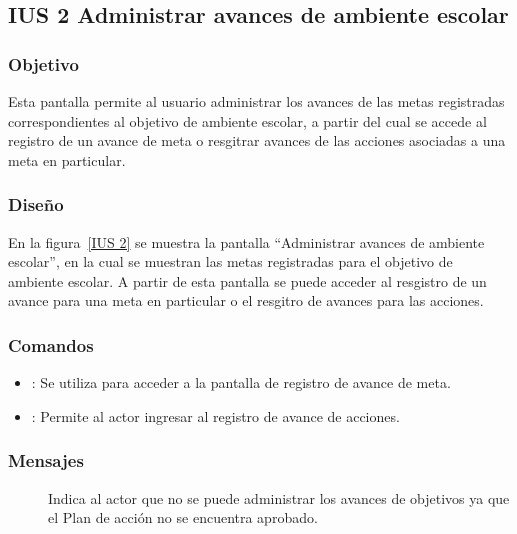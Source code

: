\subsection{IUS 2 Administrar avances de ambiente escolar}

\subsubsection{Objetivo}
	
Esta pantalla permite al usuario  administrar los avances de las metas registradas correspondientes al objetivo de ambiente escolar, a partir del cual se accede al registro de un avance de meta o resgitrar avances de las acciones asociadas a una meta en particular.

\subsubsection{Diseño}

    En la figura~\ref{IUS 2} se muestra la pantalla ``Administrar avances de ambiente escolar'', en la cual se muestran las metas registradas para el objetivo de ambiente escolar. A partir de esta pantalla se puede acceder al resgistro de un avance para una meta en particular o el resgitro de avances para las acciones. 



\subsubsection{Comandos}
    \begin{itemize}
	\item {}: Se utiliza para acceder a la pantalla de registro de avance de meta.
	\item {}: Permite al actor ingresar al registro de avance de acciones.
    \end{itemize}

\subsubsection{Mensajes}

    \begin{description}
	\item[] Indica al actor que no se puede administrar los avances de objetivos ya que el Plan de acción no se encuentra aprobado.
    \end{description}
